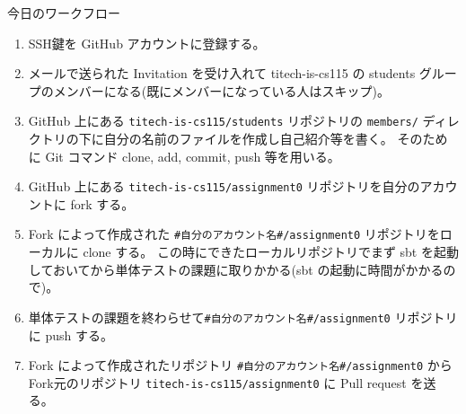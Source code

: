 \documentclass[a4paper]{article}
\begin{document}
\noindent
今日のワークフロー
\begin{enumerate}
\item SSH鍵を GitHub アカウントに登録する。
\item メールで送られた Invitation を受け入れて titech-is-cs115 の students グループのメンバーになる(既にメンバーになっている人はスキップ)。
\item GitHub 上にある \verb|titech-is-cs115/students| リポジトリの \verb|members/| ディレクトリの下に自分の名前のファイルを作成し自己紹介等を書く。
そのために Git コマンド clone, add, commit, push 等を用いる。
\item GitHub 上にある \verb|titech-is-cs115/assignment0| リポジトリを自分のアカウントに fork する。
\item Fork によって作成された \verb|#自分のアカウント名#/assignment0| リポジトリをローカルに clone する。
この時にできたローカルリポジトリでまず sbt を起動しておいてから単体テストの課題に取りかかる(sbt の起動に時間がかかるので)。
\item 単体テストの課題を終わらせて\verb|#自分のアカウント名#/assignment0| リポジトリに push する。
\item Fork によって作成されたリポジトリ \verb|#自分のアカウント名#/assignment0| から
Fork元のリポジトリ \verb|titech-is-cs115/assignment0| に Pull request を送る。
\end{enumerate}
\end{document}

